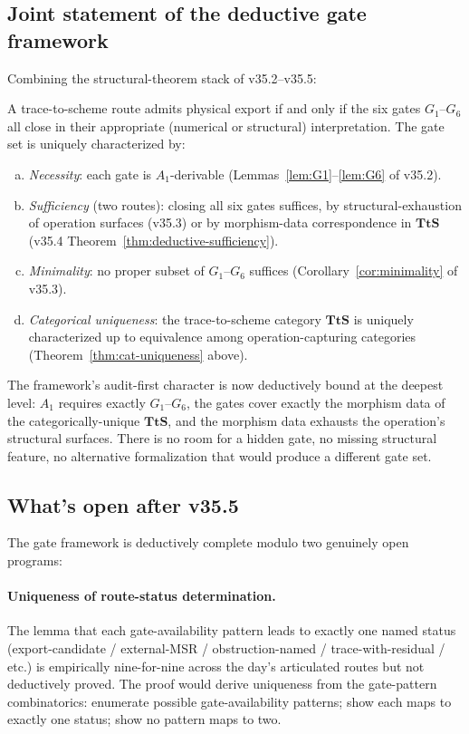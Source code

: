 \subsection{Joint statement of the deductive gate framework}
\label{subsec:deductive-complete}

Combining the structural-theorem stack of v35.2--v35.5:

\begin{theorem}
\label{thm:export-deductive}
A trace-to-scheme route admits physical export if and only if the six gates $G_1$--$G_6$ all close in their appropriate (numerical or structural) interpretation. The gate set is uniquely characterized by:
\begin{enumerate}[(a)]
\item \emph{Necessity}: each gate is $A_1$-derivable (Lemmas~\ref{lem:G1}--\ref{lem:G6} of v35.2).
\item \emph{Sufficiency} (two routes): closing all six gates suffices, by structural-exhaustion of operation surfaces (v35.3) or by morphism-data correspondence in $\mathbf{TtS}$ (v35.4 Theorem~\ref{thm:deductive-sufficiency}).
\item \emph{Minimality}: no proper subset of $G_1$--$G_6$ suffices (Corollary~\ref{cor:minimality} of v35.3).
\item \emph{Categorical uniqueness}: the trace-to-scheme category $\mathbf{TtS}$ is uniquely characterized up to equivalence among operation-capturing categories (Theorem~\ref{thm:cat-uniqueness} above).
\end{enumerate}
\end{theorem}

The framework's audit-first character is now deductively bound at the deepest level: $A_1$ requires exactly $G_1$--$G_6$, the gates cover exactly the morphism data of the categorically-unique $\mathbf{TtS}$, and the morphism data exhausts the operation's structural surfaces. There is no room for a hidden gate, no missing structural feature, no alternative formalization that would produce a different gate set.

\subsection{What's open after v35.5}
\label{subsec:post-v35-5}

The gate framework is deductively complete modulo two genuinely open programs:

\paragraph{Uniqueness of route-status determination.} The lemma that each gate-availability pattern leads to exactly one named status (export-candidate / external-MSR / obstruction-named / trace-with-residual / etc.) is empirically nine-for-nine across the day's articulated routes but not deductively proved. The proof would derive uniqueness from the gate-pattern combinatorics: enumerate possible gate-availability patterns; show each maps to exactly one status; show no pattern maps to two.

